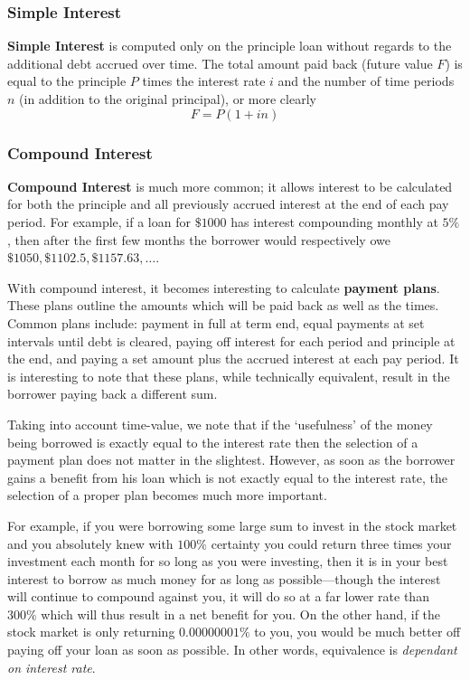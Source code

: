 \documentclass[12pt]{article}
\begin{document}
\subsubsection{Simple Interest}
{\bf Simple Interest} is computed only on the principle loan without regards to the additional debt accrued over time. The total amount paid back (future value $F$) is equal to the principle $P$ times the interest rate $i$ and the number of time periods $n$ (in addition to the original principal), or more clearly \[ F = P(1 + in) \]

\subsubsection{Compound Interest}
{\bf Compound Interest} is much more common; it allows interest to be calculated for both the principle and all previously accrued interest at the end of each pay period. For example, if a loan for $\$1000$ has interest compounding monthly at $5\%$, then after the first few months the borrower would respectively owe $\$1050, \$1102.5, \$1157.63, \dots$.

With compound interest, it becomes interesting to calculate {\bf payment plans}. These plans outline the amounts which will be paid back as well as the times. Common plans include: payment in full at term end, equal payments at set intervals until debt is cleared, paying off interest for each period and principle at the end, and paying a set amount plus the accrued interest at each pay period. It is interesting to note that these plans, while technically equivalent, result in the borrower paying back a different sum.

Taking into account time-value, we note that if the `usefulness' of the money being borrowed is exactly equal to the interest rate then the selection of a payment plan does not matter in the slightest. However, as soon as the borrower gains a benefit from his loan which is not exactly equal to the interest rate, the selection of a proper plan becomes much more important.

For example, if you were borrowing some large sum to invest in the stock market and you absolutely knew with $100\%$ certainty you could return three times your investment each month for so long as you were investing, then it is in your best interest to borrow as much money for as long as possible---though the interest will continue to compound against you, it will do so at a far lower rate than $300\%$ which will thus result in a net benefit for you. On the other hand, if the stock market is only returning $0.00000001\%$ to you, you would be much better off paying off your loan as soon as possible. In other words, equivalence is \emph{dependant on interest rate}.
\end{document}
